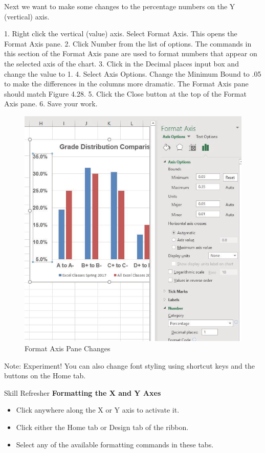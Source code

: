 Next we want to make some changes to the percentage numbers on the Y (vertical) axis.

1. Right click the vertical (value) axis. Select Format Axis. This opens the Format Axis pane.
2. Click Number from the list of options. The commands in this section of the Format Axis pane
are used to format numbers that appear on the selected axis of the chart.
3. Click in the Decimal places input box and change the value to 1.
4. Select Axis Options. Change the Minimum Bound to .05 to make the differences in the
columns more dramatic. The Format Axis pane should match Figure 4.28.
5. Click the Close button at the top of the Format Axis pane.
6. Save your work.


\begin{figure}[H]
	\centering
	\includegraphics[width=\maxwidth{.95\linewidth}]{gfx/ch04_fig29}
	\caption{Format Axis Pane Changes}
	\label{04:fig29}
\end{figure}

Note: Experiment! You can also change font styling using shortcut keys and the buttons on the Home
tab.

\begin{center}
	\begin{sklbox}{Skill Refresher}
		\textbf{Formatting the X and Y Axes}
		\\
		\begin{itemize}
			\setlength{\itemsep}{0pt}
			\setlength{\parskip}{0pt}
			\setlength{\parsep}{0pt}

			\item Click anywhere along the X or Y axis to activate it.
			\item Click either the Home tab or Design tab of the ribbon.
			\item Select any of the available formatting commands in these tabs.
			
		\end{itemize}
	\end{sklbox}
\end{center}



